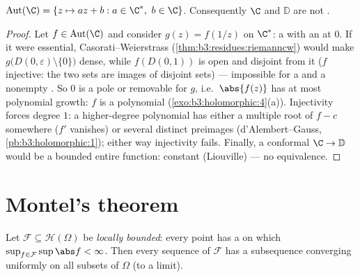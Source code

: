 \begin{theorem}
\label{thm:b3:conformal:autplane}
$\operatorname{Aut}(\C) = \{z \mapsto az + b : a \in \C^*,\ b
\in \C\}$. Consequently $\C$ and $\mathbb D$ are not
.
\end{theorem}

\begin{proof}
Let $f \in \operatorname{Aut}(\C)$ and consider $g(z) =
f(1/z)$ on $\C^*$: a  with an  at $0$. If it were essential,
Casorati--Weierstrass (\cref{thm:b3:residues:riemanncw}) would
make $g\bigl(D(0,\varepsilon)\setminus\{0\}\bigr)$ dense,
while $f(D(0, 1))$ is open and disjoint from it ($f$
injective: the two sets are images of disjoint sets) ---
impossible for a  and a nonempty . So $0$ is
a pole or removable for $g$, i.e.\ $\abs{f(z)}$ has at most
polynomial growth: $f$ is a polynomial
(\cref{exo:b3:holomorphic:4}(a)). Injectivity forces degree
$1$: a higher-degree polynomial has either a multiple root of
$f - c$ somewhere ($f'$ vanishes) or several distinct
preimages (d'Alembert--Gauss, \cref{pb:b3:holomorphic:1});
either way injectivity fails. Finally, a conformal $\C \to
\mathbb D$ would be a bounded entire function: constant
(Liouville) --- no equivalence.
\end{proof}

\section{Montel's theorem}

\begin{theorem}[Montel]\label{thm:b3:conformal:montel}
Let $\mathcal F \subseteq \mathcal H(\Omega)$ be \emph{locally
bounded}: every point has a  on which $\sup_{f\in
\mathcal F}\sup\abs f < \infty$. Then every sequence of
$\mathcal F$ has a subsequence converging uniformly on all
 subsets of $\Omega$ (to a 
limit).
\end{theorem}


